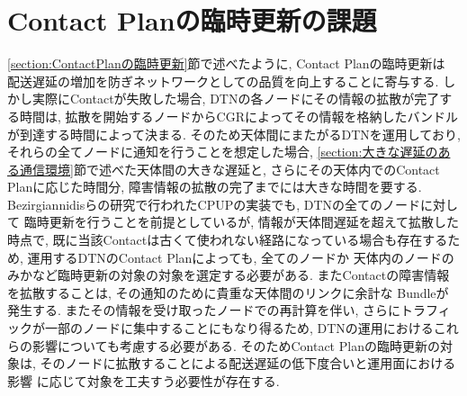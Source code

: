 \section{Contact Planの臨時更新の課題}
\label{section:ContactPlanの臨時更新の課題}
\ref{section:ContactPlanの臨時更新}節で述べたように, Contact Planの臨時更新は
配送遅延の増加を防ぎネットワークとしての品質を向上することに寄与する. 
しかし実際にContactが失敗した場合, DTNの各ノードにその情報の拡散が完了する時間は, 
拡散を開始するノードからCGRによってその情報を格納したバンドルが到達する時間によって決まる.  
そのため天体間にまたがるDTNを運用しており, それらの全てノードに通知を行うことを想定した場合, 
\ref{section:大きな遅延のある通信環境}節で述べた天体間の大きな遅延と, 
さらにその天体内でのContact Planに応じた時間分, 障害情報の拡散の完了までには大きな時間を要する.  
Bezirgiannidisらの研究で行われたCPUPの実装でも, DTNの全てのノードに対して
臨時更新を行うことを前提としているが, 情報が天体間遅延を超えて拡散した時点で, 
既に当該Contactは古くて使われない経路になっている場合も存在するため, 
運用するDTNのContact Planによっても, 全てのノードか
天体内のノードのみかなど臨時更新の対象の対象を選定する必要がある.  
またContactの障害情報を拡散することは, その通知のために貴重な天体間のリンクに余計な
Bundleが発生する. またその情報を受け取ったノードでの再計算を伴い, 
さらにトラフィックが一部のノードに集中することにもなり得るため, 
DTNの運用におけるこれらの影響についても考慮する必要がある.  
そのためContact Planの臨時更新の対象は, そのノードに拡散することによる配送遅延の低下度合いと運用面における影響
に応じて対象を工夫すう必要性が存在する.  